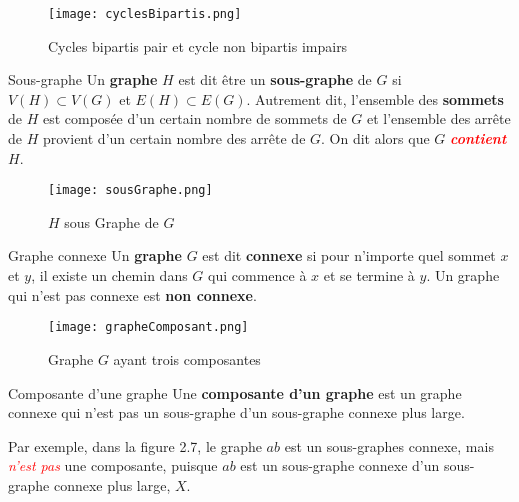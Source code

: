 \documentclass[16pt]{report}
\begin{document}
\begin{multicols*}{2}
             \begin{figure}[H]
                \begin{center}
                    \texttt{[image: cyclesBipartis.png]}
                \end{center}
                \caption{Cycles bipartis pair et cycle non bipartis impairs}
             \end{figure}

             \begin{Definitionx}{Sous-graphe}{}
                 Un \textbf{graphe} $H$ est dit être un \textbf{sous-graphe} de $G$ si 
                 $V(H) \subset V(G)$ et $E(H) \subset E(G)$. Autrement dit, l'ensemble 
                 des \textbf{sommets} de $H$ est composée d'un certain nombre de sommets de $G$ 
                 et l'ensemble des arrête de $H$ provient d'un certain nombre des arrête de $G$.  
                 On dit alors que $G$ \textbf{\textcolor{red}{\textit{contient}}} $H$.   
             \end{Definitionx}


             \begin{figure}[H]
                \begin{center}
                    \texttt{[image: sousGraphe.png]}
                \end{center}
                \caption{$H$ sous Graphe de $G$}
             \end{figure}


             \begin{Definitionx}{Graphe connexe}{}
                 Un \textbf{graphe} $G$ est dit \textbf{connexe} si pour n'importe quel sommet $x$ et $y$, 
                 il existe un chemin dans $G$ qui commence à $x$ et se termine à $y$. Un graphe qui n'est 
                 pas connexe est \textbf{non connexe}.   
             \end{Definitionx}
             

             \begin{figure}[H]
                \begin{center}
                    \texttt{[image: grapheComposant.png]}
                \end{center}
                \caption{Graphe $G$ ayant trois composantes}
             \end{figure}

             \begin{Definitionx}{Composante d'une graphe}{}
                 Une \textbf{composante d'un graphe} est un graphe connexe qui n'est pas un sous-graphe d'un 
                 sous-graphe connexe plus large. 
             \end{Definitionx}
             Par exemple, dans la figure 2.7, le graphe $ab$ est un sous-graphes connexe, mais 
             \textit{\textcolor{red}{n'est pas}  } une composante, puisque $ab$ est un sous-graphe connexe 
             d'un sous-graphe connexe plus large, $X$. 



\end{multicols*}
\end{document}
